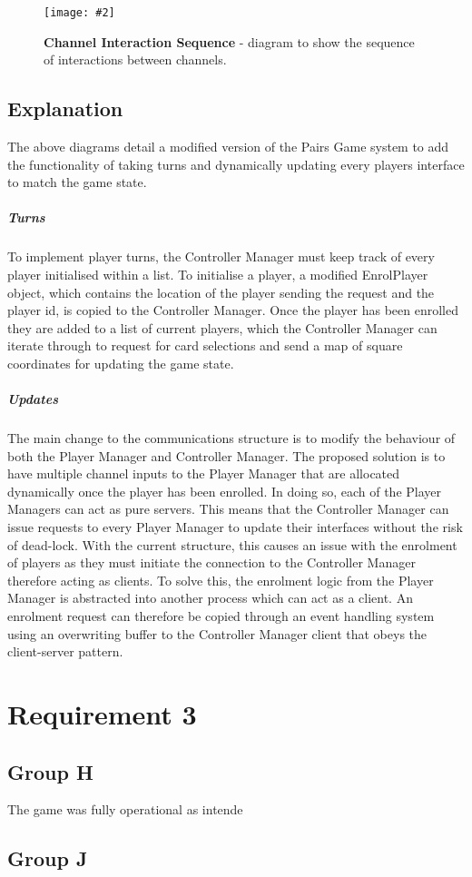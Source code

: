 \documentclass[10pt, a4paper]{article}
\newcommand{\figuremacro}[5]{
    \begin{figure}[#1]
        \centering
        \texttt{[image: \#2]}
        \caption[#3]{\textbf{#3}#4}
        \label{fig:#2}
    \end{figure}
}
\begin{document}
	\figuremacro{H}{channelInt}{Channel Interaction Sequence}{ - diagram to show the sequence of interactions between channels.}{1.0}
	
	\subsection{Explanation}
	
	The above diagrams detail a modified version of the Pairs Game system to add the functionality of taking turns and dynamically updating every players interface to match the game state.
	
	\subparagraph{Turns}	
	To implement player turns, the Controller Manager must keep track of every player initialised within a list. To initialise a player, a modified EnrolPlayer object, which contains the location of the player sending the request and the player id, is copied to the Controller Manager. Once the player has been enrolled they are added to a list of current players, which the Controller Manager can iterate through to request for card selections and send a map of square coordinates for updating the game state.
	
	\subparagraph{Updates}
	The main change to the communications structure is to modify the behaviour of both the Player Manager and Controller Manager.	The proposed solution is to have multiple channel inputs to the Player Manager that are allocated dynamically once the player has been enrolled. In doing so, each of the Player Managers can act as pure servers. This means that the Controller Manager can issue requests to every Player Manager to update their interfaces without the risk of dead-lock. With the current structure, this causes an issue with the enrolment of players as they must initiate the connection to the Controller Manager therefore acting as clients. To solve this, the enrolment logic from the Player Manager is abstracted into another process which can act as a client. An enrolment request can therefore be copied through an event handling system using an overwriting buffer to the Controller Manager client that obeys the client-server pattern.
	
	\section{Requirement 3}
	\subsection{Group H}
	

	The game was fully operational as intende
	
	
	\subsection{Group J}
	
	
\end{document}
